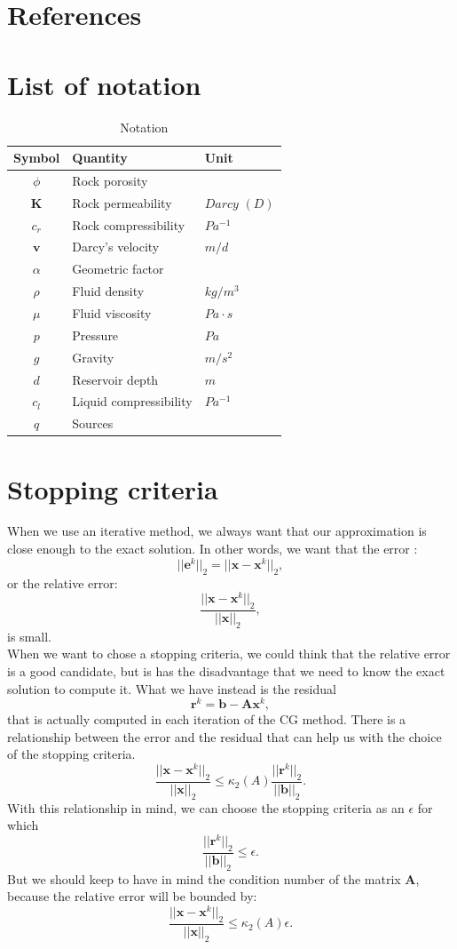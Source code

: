 \documentclass[review]{elsarticle}
\begin{document}
\section*{References}


\appendix
\section{List of notation}\label{a1}

\begin{table}[!h]
\centering
\begin{tabular}{c l l }
\hline
Symbol & Quantity & Unit \\[0.5ex]
\hline
$\phi$ & Rock porosity&   \\
 $\mathbf{K}$& Rock permeability&  $Darcy$ $(D)$ \\
 $c_r$& Rock compressibility&  $Pa^{-1}$ \\
$\mathbf{v}$ & Darcy's velocity& $ m/d$ \\
 $\alpha$& Geometric factor&   \\
$\rho$ &Fluid density &  $kg/m^3$ \\
 $\mu$&Fluid viscosity & $Pa \cdot s$   \\
${p}$  &Pressure &  $Pa$ \\
$g$  &Gravity &  $m/s^2$ \\
$d$ & Reservoir depth&  $m$ \\
$c_l$ &Liquid compressibility &  $Pa^{-1}$ \\
$q$ &Sources &   \\
\hline
\end{tabular}\label{table:symbols}
\caption{Notation}
\end{table}

\section{Stopping criteria}\label{a2}
When we use an iterative method, we always want that our approximation is close enough 
to the exact solution. In other words, we want that the error \cite[pag. 42]{Saad03}: 
$$||\mathbf{e}^k||_2=||\mathbf{x}-\mathbf{x}^k||_2,$$ or the relative error: 
$$\frac{||\mathbf{x}-\mathbf{x}^k||_2}{||\mathbf{x}||_2},$$is small. \\
When we want to chose a stopping criteria, we could think that the relative error is a
good candidate, but is has the disadvantage that we need to know the exact solution to compute it.
What we have instead is the residual $$\mathbf{r}^k=\mathbf{b}-\mathbf{A}\mathbf{x}^k,$$ 
that is actually computed in each iteration of the CG method. There is a relationship between the 
error and the residual that can help us with the choice of the stopping criteria.
$$\frac{||\mathbf{x}-\mathbf{x}^k||_2}{||\mathbf{x}||_2}\leq \kappa_2(A)\frac{||\mathbf{r}^k||_2}{||\mathbf{b}||_2}.$$
With this relationship in mind, we can choose the stopping criteria as an $\epsilon$ for which
$$ \frac{||\mathbf{r}^k||_2}{||\mathbf{b}||_2}\leq \epsilon.$$
But we should keep to have in mind the condition number of the matrix $\mathbf{A}$, because the relative error will be bounded by:
$$\frac{||\mathbf{x}-\mathbf{x}^k||_2}{||\mathbf{x}||_2}\leq \kappa_2(A) \epsilon.$$
\end{document}
